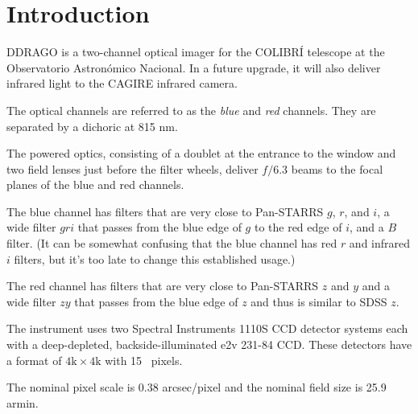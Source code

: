 \chapter{Introduction}

DDRAGO is a two-channel optical imager for the COLIBRÍ telescope at the Observatorio Astronómico Nacional. In a future upgrade, it will also deliver infrared light to the CAGIRE infrared camera.

The optical channels are referred to as the \emph{blue} and \emph{red} channels. They are separated by a dichoric at 815 nm. 

The powered optics, consisting of a doublet at the entrance to the window and two field lenses just before the filter wheels, deliver $f/6.3$ beams to the focal planes of the blue and red channels.

The blue channel has filters that are very close to Pan-STARRS $g$, $r$, and $i$, a wide filter $gri$ that passes from the blue edge of $g$ to the red edge of $i$, and a $B$ filter. (It can be somewhat confusing that the blue channel has red $r$ and infrared $i$ filters, but it's too late to change this established usage.)

The red channel has filters that are very close to Pan-STARRS $z$ and $y$ and a wide filter $zy$ that passes from the blue edge of $z$ and thus is similar to SDSS $z$.

The instrument uses two Spectral Instruments 1110S CCD detector systems each with a deep-depleted, backside-illuminated e2v 231-84 CCD. These detectors have a format of $4\mathrm{k}\times4\mathrm{k}$ with 15~{\micron} pixels.

The nominal pixel scale is 0.38 \unit{arcsec/pixel} and the nominal field size is 25.9 \unit{armin}.
